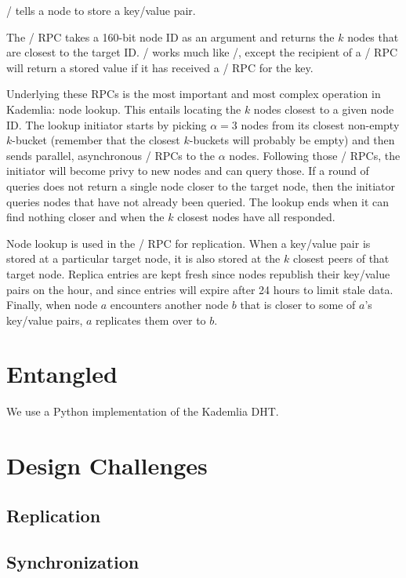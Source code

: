 \documentclass[12pt,twocolumn]{article}
\begin{document}
\store/ tells a node to store a key/value pair.

The \findNode/ RPC takes a 160-bit node ID as an argument and returns the $k$ nodes that are closest to the target ID. \findValue/ works much like \findNode/, except the recipient of a \findValue/ RPC will return a stored value if it has received a \store/ RPC for the key.

Underlying these RPCs is the most important and most complex operation in Kademlia: node lookup. This entails locating the $k$ nodes closest to a given node ID. The lookup initiator starts by picking $\alpha = 3$ nodes from its closest non-empty $k$-bucket (remember that the closest $k$-buckets will probably be empty) and then sends parallel, asynchronous \findNode/ RPCs to the $\alpha$ nodes. Following those \findNode/ RPCs, the initiator will become privy to new nodes and can query those. If a round of queries does not return a single node closer to the target node, then the initiator queries nodes that have not already been queried. The lookup ends when it can find nothing closer and when the $k$ closest nodes have all responded.

Node lookup is used in the \store/ RPC for replication. When a key/value pair is stored at a particular target node, it is also stored at the $k$ closest peers of that target node. Replica entries are kept fresh since nodes republish their key/value pairs on the hour, and since entries will expire after 24 hours to limit stale data. Finally, when node $a$ encounters another node $b$ that is closer to some of $a$'s key/value pairs, $a$ replicates them over to $b$.

\section{Entangled}
We use a Python implementation of the Kademlia DHT.



\section{Design Challenges}
\subsection{Replication}
\subsection{Synchronization}
\end{document}
